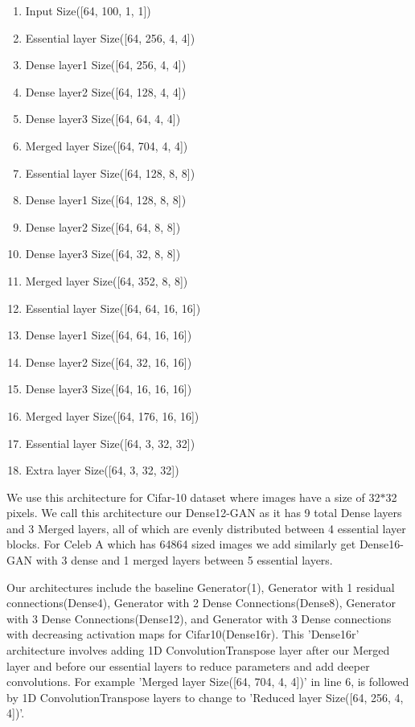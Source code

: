 \documentclass{article}
\begin{document}
\begin{enumerate}
    \item Input Size([64, 100, 1, 1])
    \item Essential layer Size([64, 256, 4, 4])
    \item Dense layer1 Size([64, 256, 4, 4])
    \item Dense layer2 Size([64, 128, 4, 4])
    \item Dense layer3 Size([64, 64, 4, 4])
    \item Merged layer Size([64, 704, 4, 4])
    \item Essential layer Size([64, 128, 8, 8])
    \item Dense layer1 Size([64, 128, 8, 8])
    \item Dense layer2 Size([64, 64, 8, 8])
    \item Dense layer3 Size([64, 32, 8, 8])
    \item Merged layer Size([64, 352, 8, 8])
    \item Essential layer Size([64, 64, 16, 16])
    \item Dense layer1 Size([64, 64, 16, 16])
    \item Dense layer2 Size([64, 32, 16, 16])
    \item Dense layer3 Size([64, 16, 16, 16])
    \item Merged layer Size([64, 176, 16, 16])
    \item Essential layer Size([64, 3, 32, 32])
    \item Extra layer Size([64, 3, 32, 32])
\end{enumerate}

We use this architecture for Cifar-10 dataset where images have a size of 32$*$32 pixels. We call this architecture our Dense12-GAN as it has 9 total Dense layers and 3 Merged layers, all of which are evenly distributed between 4 essential layer blocks. For Celeb A which has 64$8$64 sized images we add similarly get Dense16-GAN with 3 dense and 1 merged layers between 5 essential layers.

Our architectures include the baseline Generator(1), Generator with 1 residual connections(Dense4), Generator with 2 Dense Connections(Dense8), Generator with 3 Dense Connections(Dense12), and Generator with 3 Dense connections with decreasing activation maps for Cifar10(Dense16r). This 'Dense16r' architecture involves adding 1D ConvolutionTranspose layer after our Merged layer and before our essential layers to reduce parameters and add deeper convolutions. For example 'Merged layer Size([64, 704, 4, 4])' in line 6, is followed by 1D ConvolutionTranspose layers to change to 'Reduced layer Size([64, 256, 4, 4])'.
\end{document}
